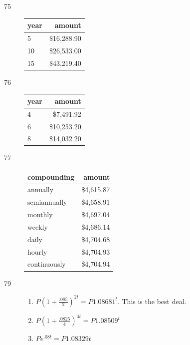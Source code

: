 \documentclass{exam}
\begin{document}
\begin{description}
      \item[75]
        \begin{tabular}[H]{lr}
          \toprule
          year & amount \\
          \midrule
          5    & \$16,288.90 \\
          10   & \$26,533.00 \\
          15   & \$43,219.40 \\
          \bottomrule
        \end{tabular}

      \item[76]
        \begin{tabular}[H]{lr}
          \toprule
          year & amount \\
          \midrule
          4    & \$7,491.92 \\
          6    & \$10,253.20 \\
          8    & \$14,032.20 \\
          \bottomrule
        \end{tabular}

      \item[77]
        \begin{tabular}[H]{lr}
          \toprule
          compounding  & amount \\
          \midrule
          annually     & \$4,615.87 \\
          semiannually & \$4,658.91 \\
          monthly      & \$4,697.04 \\
          weekly       & \$4,686.14 \\
          daily        & \$4,704.68 \\
          hourly       & \$4,704.93 \\
          continuously & \$4,704.94 \\
          \bottomrule
        \end{tabular}

      \item[79]
        \begin{enumerate}[i]
          \item $P \left( 1 + \frac{.085}{2} \right)^{2t} = P 1.08681^t$.  This is the best deal.
          \item $P \left( 1 + \frac{.0825}{4} \right)^{4t} = P 1.08509^t$
          \item $P e^{.08t} = P 1.08329 t$
        \end{enumerate}


\end{description}
\end{document}
